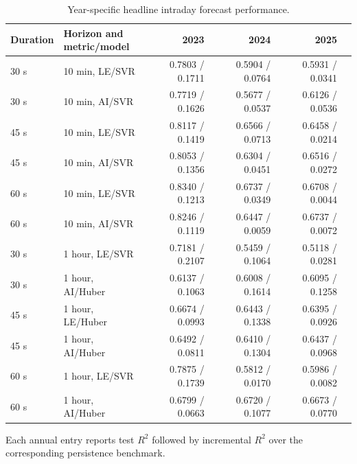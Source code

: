 
\begin{table}[t]
\centering
\caption{Year-specific headline intraday forecast performance.}
\label{tab:year_specific_intraday}
\scriptsize
\setlength{\tabcolsep}{5pt}
\begin{tabular}{llrrrr}
\toprule
Duration & \shortstack{Horizon and\\metric/model} &
2023 & 2024 & 2025\\
\midrule
30 s & 10 min, LE/SVR & 0.7803 / 0.1711 & 0.5904 / 0.0764 & 0.5931 / 0.0341\\
30 s & 10 min, AI/SVR & 0.7719 / 0.1626 & 0.5677 / 0.0537 & 0.6126 / 0.0536\\
45 s & 10 min, LE/SVR & 0.8117 / 0.1419 & 0.6566 / 0.0713 & 0.6458 / 0.0214\\
45 s & 10 min, AI/SVR & 0.8053 / 0.1356 & 0.6304 / 0.0451 & 0.6516 / 0.0272\\
60 s & 10 min, LE/SVR & 0.8340 / 0.1213 & 0.6737 / 0.0349 & 0.6708 / 0.0044\\
60 s & 10 min, AI/SVR & 0.8246 / 0.1119 & 0.6447 / 0.0059 & 0.6737 / 0.0072\\
\midrule
30 s & 1 hour, LE/SVR & 0.7181 / 0.2107 & 0.5459 / 0.1064 & 0.5118 / 0.0281\\
30 s & 1 hour, AI/Huber & 0.6137 / 0.1063 & 0.6008 / 0.1614 & 0.6095 / 0.1258\\
45 s & 1 hour, LE/Huber & 0.6674 / 0.0993 & 0.6443 / 0.1338 & 0.6395 / 0.0926\\
45 s & 1 hour, AI/Huber & 0.6492 / 0.0811 & 0.6410 / 0.1304 & 0.6437 / 0.0968\\
60 s & 1 hour, LE/SVR & 0.7875 / 0.1739 & 0.5812 / 0.0170 & 0.5986 / 0.0082\\
60 s & 1 hour, AI/Huber & 0.6799 / 0.0663 & 0.6720 / 0.1077 & 0.6673 / 0.0770\\
\bottomrule
\end{tabular}
\begin{minipage}{0.94\linewidth}\footnotesize
Each annual entry reports test \(R^2\) followed by incremental \(R^2\) over
the corresponding persistence benchmark.
\end{minipage}
\end{table}
